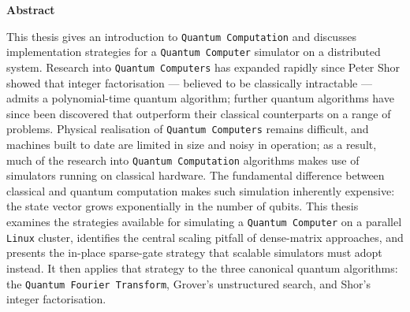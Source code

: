 \newpage

\rhead{\bfseries \thepage}
\vspace*{\fill}
\begin{center}
{\bf Abstract}
\end{center}
This thesis gives an introduction to {\tt Quantum Computation} and discusses implementation strategies for a {\tt Quantum Computer} simulator on a distributed system. Research into {\tt Quantum Computers} has expanded rapidly since Peter Shor showed that integer factorisation --- believed to be classically intractable --- admits a polynomial-time quantum algorithm; further quantum algorithms have since been discovered that outperform their classical counterparts on a range of problems. Physical realisation of {\tt Quantum Computers} remains difficult, and machines built to date are limited in size and noisy in operation; as a result, much of the research into {\tt Quantum Computation} algorithms makes use of simulators running on classical hardware. The fundamental difference between classical and quantum computation makes such simulation inherently expensive: the state vector grows exponentially in the number of qubits. This thesis examines the strategies available for simulating a {\tt Quantum Computer} on a parallel {\tt Linux} cluster, identifies the central scaling pitfall of dense-matrix approaches, and presents the in-place sparse-gate strategy that scalable simulators must adopt instead. It then applies that strategy to the three canonical quantum algorithms: the {\tt Quantum Fourier Transform}, Grover's unstructured search, and Shor's integer factorisation.
\vspace*{\fill}
